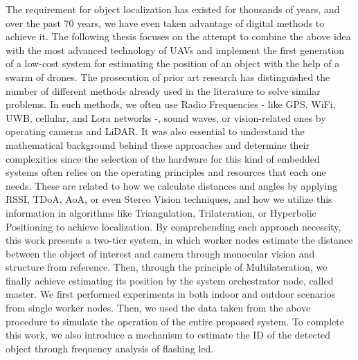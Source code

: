 \begin{extraAbstract}
	\addchaptertocentry{\abstractname} %
	The requirement for object localization has existed for thousands of years, and over the past 70 years, we have even taken advantage of digital methods to achieve it.
	The following thesis focuses on the attempt to combine the above idea with the most advanced technology of UAVs and implement the first generation of a low-cost system for estimating the position of an object with the help of a swarm of drones.
	The prosecution of prior art research has distinguished the number of different methods already used in the literature to solve similar problems.
	In such methods, we often use Radio Frequencies - like GPS, WiFi, UWB, cellular, and Lora networks -, sound waves, or vision-related ones by operating cameras and LiDAR.
	It was also essential to understand the mathematical background behind these approaches and determine their complexities since the selection of the hardware for this kind of embedded systems often relies on the operating principles and resources that each one needs.
	 These are related to how we calculate distances and angles by applying RSSI, TDoA, AoA, or even Stereo Vision techniques, and how we utilize this information in algorithms like Triangulation, Trilateration, or Hyperbolic Positioning to achieve localization.
	By comprehending each approach necessity, this work presents a two-tier system, in which worker nodes estimate the distance between the object of interest and camera through monocular vision and structure from reference. Then, through the principle of Multilateration, we finally achieve estimating its position by the system orchestrator node, called master.
	We first performed experiments in both indoor and outdoor scenarios from single worker nodes. Then, we used the data taken from the above procedure to simulate the operation of the entire proposed system. To complete this work, we also introduce a mechanism to estimate the ID of the detected object through frequency analysis of flashing led.
\end{extraAbstract}

